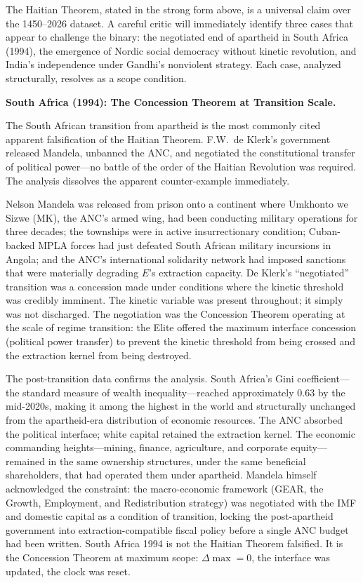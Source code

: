 The Haitian Theorem, stated in the strong form above, is a universal claim over the 1450--2026 dataset. A careful critic will immediately identify three cases that appear to challenge the binary: the negotiated end of apartheid in South Africa (1994), the emergence of Nordic social democracy without kinetic revolution, and India's independence under Gandhi's nonviolent strategy. Each case, analyzed structurally, resolves as a scope condition.

\textbf{South Africa (1994): The Concession Theorem at Transition Scale.}

The South African transition from apartheid is the most commonly cited apparent falsification of the Haitian Theorem. F.W.\ de Klerk's government released Mandela, unbanned the ANC, and negotiated the constitutional transfer of political power---no battle of the order of the Haitian Revolution was required. The analysis dissolves the apparent counter-example immediately.

Nelson Mandela was released from prison onto a continent where Umkhonto we Sizwe (MK), the ANC's armed wing, had been conducting military operations for three decades; the townships were in active insurrectionary condition; Cuban-backed MPLA forces had just defeated South African military incursions in Angola; and the ANC's international solidarity network had imposed sanctions that were materially degrading $E$'s extraction capacity. De Klerk's ``negotiated'' transition was a concession made under conditions where the kinetic threshold was credibly imminent. The kinetic variable was present throughout; it simply was not discharged. The negotiation was the Concession Theorem operating at the scale of regime transition: the Elite offered the maximum interface concession (political power transfer) to prevent the kinetic threshold from being crossed and the extraction kernel from being destroyed.

The post-transition data confirms the analysis. South Africa's Gini coefficient---the standard measure of wealth inequality---reached approximately 0.63 by the mid-2020s, making it among the highest in the world and structurally unchanged from the apartheid-era distribution of economic resources. The ANC absorbed the political interface; white capital retained the extraction kernel. The economic commanding heights---mining, finance, agriculture, and corporate equity---remained in the same ownership structures, under the same beneficial shareholders, that had operated them under apartheid. Mandela himself acknowledged the constraint: the macro-economic framework (GEAR, the Growth, Employment, and Redistribution strategy) was negotiated with the IMF and domestic capital as a condition of transition, locking the post-apartheid government into extraction-compatible fiscal policy before a single ANC budget had been written. South Africa 1994 is not the Haitian Theorem falsified. It is the Concession Theorem at maximum scope: $\Delta\max = 0$, the interface was updated, the clock was reset.

